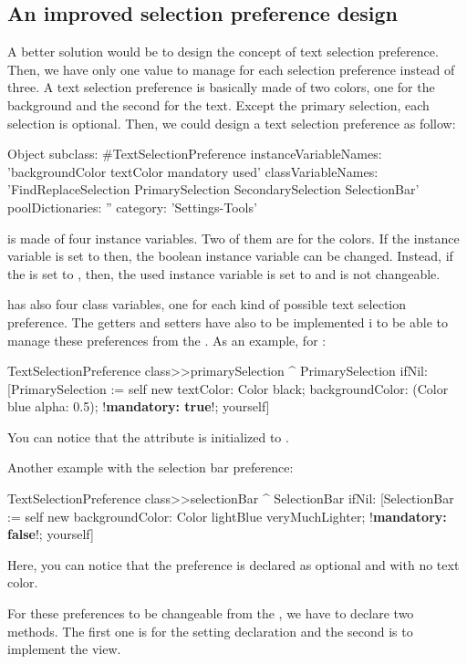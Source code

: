\documentclass[a4paper,10pt,twoside]{book}
\begin{document}
{\subsection{An improved selection preference design}
A better solution would be to design the concept of text selection preference. Then, we have only one value to manage for each selection preference instead of three. A text selection preference is basically made of two colors, one for the background and the second for the text. Except the primary selection, each selection is optional. Then, we could design a text selection preference as follow:
\begin{code}{}
Object subclass: #TextSelectionPreference
	instanceVariableNames: 'backgroundColor textColor mandatory used'
	classVariableNames: 'FindReplaceSelection PrimarySelection SecondarySelection SelectionBar'
	poolDictionaries: ''
	category: 'Settings-Tools'
\end{code}
 is made of four instance variables. Two of them are for the colors. If the  instance variable is set to  then, the  boolean instance variable can be changed. Instead, if the  is set to , then, the used instance variable is set to  and is not changeable. 

 has also four class variables, one for each kind of possible text selection preference. The getters and setters have also to be implemented i to be able to manage these preferences from the \setbrowser.
As an example, for :
\begin{code}{}
TextSelectionPreference class>>primarySelection
	^ PrimarySelection
		ifNil: [PrimarySelection := self new 
						textColor: Color black;
						backgroundColor: (Color blue alpha: 0.5);
						!\textbf{mandatory: true}!;
						yourself]
\end{code}
You can notice that the  attribute is initialized to .

Another example with the selection bar preference:
\begin{code}{}
TextSelectionPreference class>>selectionBar
	^ SelectionBar
		ifNil: [SelectionBar := self new 
					backgroundColor: Color lightBlue veryMuchLighter;
					!\textbf{mandatory: false}!;
					yourself]
\end{code}
Here, you can notice that the preference is declared as optional and with no text color. 

For these preferences to be changeable from the \setbrowser, we have to declare two methods. The first one is for the setting declaration and the second is to implement the view. 

}
\end{document}
